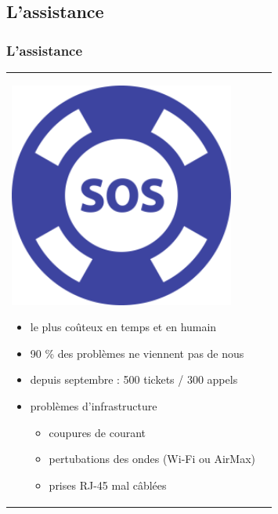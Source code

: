 \documentclass[handout]{beamer}
\begin{document}
	\subsection{L'assistance}
		\begin{frame}
		\frametitle{L'assistance}
		\begin{tabular}{l l}
			\begin{minipage}{0.2\textwidth}
				\begin{center}
					\includegraphics[width=0.9\textwidth]{images/support.png}
				\end{center}
			\end{minipage}

			\begin{minipage}{0.8\textwidth}
				\begin{itemize}
					\item le plus coûteux en temps et en humain
					\item 90 \% des problèmes ne viennent pas de nous
					\item depuis septembre : 500 tickets / 300 appels
					\item problèmes d'infrastructure
					\begin{itemize}
						\item coupures de courant
						\item pertubations des ondes (Wi-Fi ou AirMax)
						\item prises RJ-45 mal câblées
					\end{itemize}
				\end{itemize}
			\end{minipage}
			
		\end{tabular}
		\end{frame}


\end{document}

